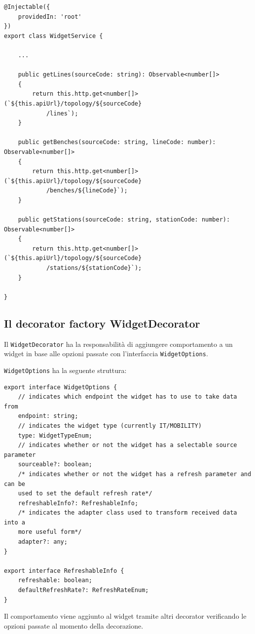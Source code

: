 \begin{lstlisting}[caption={Metodi per recuperare linee, banchi e stazioni all'interno della classe WidgetService}, style=javaScriptCode]
@Injectable({
    providedIn: 'root'
})
export class WidgetService {

    ...
        
    public getLines(sourceCode: string): Observable<number[]> 
    {
        return this.http.get<number[]>(`${this.apiUrl}/topology/${sourceCode}
            /lines`);
    }

    public getBenches(sourceCode: string, lineCode: number): Observable<number[]> 
    {
        return this.http.get<number[]>(`${this.apiUrl}/topology/${sourceCode}
            /benches/${lineCode}`);
    }

    public getStations(sourceCode: string, stationCode: number): Observable<number[]> 
    {
        return this.http.get<number[]>(`${this.apiUrl}/topology/${sourceCode}
            /stations/${stationCode}`);
    }

}
\end{lstlisting}

\subsection{Il decorator factory WidgetDecorator}
\label{subsec:widgetDecorator}
Il \verb|WidgetDecorator| ha la responsabilità di aggiungere comportamento a un widget in base alle opzioni passate con l'interfaccia \verb|WidgetOptions|.

\verb|WidgetOptions| ha la seguente struttura:

\begin{lstlisting}[caption={Struttura delle WidgetOptions e delle RefreshableInfo}, style=javaScriptCode]
export interface WidgetOptions {
    // indicates which endpoint the widget has to use to take data from
    endpoint: string;
    // indicates the widget type (currently IT/MOBILITY)
    type: WidgetTypeEnum;
    // indicates whether or not the widget has a selectable source parameter
    sourceable?: boolean;
    /* indicates whether or not the widget has a refresh parameter and can be 
    used to set the default refresh rate*/
    refreshableInfo?: RefreshableInfo; 
    /* indicates the adapter class used to transform received data into a 
    more useful form*/
    adapter?: any;
}

export interface RefreshableInfo {
    refreshable: boolean;
    defaultRefreshRate?: RefreshRateEnum;
}
\end{lstlisting}
Il comportamento viene aggiunto al widget tramite altri decorator verificando le opzioni passate al momento della decorazione.

